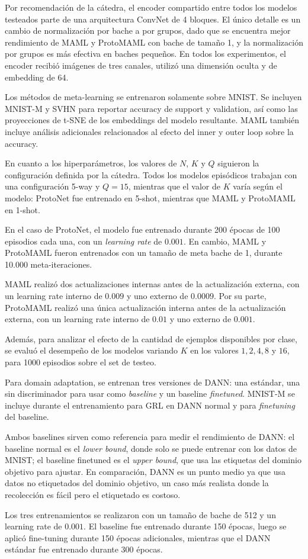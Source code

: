 Por recomendación de la cátedra, el encoder compartido entre todos los modelos testeados parte de una arquitectura ConvNet de 4 bloques. El único detalle es un cambio de normalización por bache a por grupos, dado que se encuentra mejor rendimiento de MAML y ProtoMAML con bache de tamaño 1, y la normalización por grupos es más efectiva en baches pequeños. En todos los experimentos, el encoder recibió imágenes de tres canales, utilizó una dimensión oculta y de embedding de 64.

Los métodos de meta-learning se entrenaron solamente sobre MNIST. Se incluyen MNIST-M y SVHN para reportar accuracy de support y validation, así como las proyecciones de t-SNE de los embeddings del modelo resultante. MAML también incluye análisis adicionales relacionados al efecto del inner y outer loop sobre la accuracy.

En cuanto a los hiperparámetros, los valores de $N$, $K$ y $Q$ siguieron la configuración definida por la cátedra. Todos los modelos episódicos trabajan con una configuración 5-way y $Q=15$, mientras que el valor de $K$ varía según el modelo: ProtoNet fue entrenado en 5-shot, mientras que MAML y ProtoMAML en 1-shot.

En el caso de ProtoNet, el modelo fue entrenado durante 200 épocas de 100 episodios cada una, con un \textit{learning rate} de $0.001$. En cambio, MAML y ProtoMAML fueron entrenados con un tamaño de meta bache de 1, durante 10.000 meta-iteraciones.

MAML realizó dos actualizaciones internas antes de la actualización externa, con un learning rate interno de $0.009$ y uno externo de $0.0009$. Por su parte, ProtoMAML realizó una única actualización interna antes de la actualización externa, con un learning rate interno de $0.01$ y uno externo de $0.001$.

Además, para analizar el efecto de la cantidad de ejemplos disponibles por clase, se evaluó el desempeño de los modelos variando $K$ en los valores $1, 2, 4, 8$ y $16$, para 1000 episodios sobre el set de testeo.

Para domain adaptation, se entrenan tres versiones de DANN: una estándar, una sin discriminador para usar como \textit{baseline} y un baseline \textit{finetuned}. MNIST-M se incluye durante el entrenamiento para GRL en DANN normal y para \textit{finetuning} del baseline.

Ambos baselines sirven como referencia para medir el rendimiento de DANN: el baseline normal es el \textit{lower bound}, donde solo se puede entrenar con los datos de MNIST; el baseline finetuned es el \textit{upper bound}, que usa las etiquetas del dominio objetivo para ajustar. En comparación, DANN es un punto medio ya que usa datos no etiquetados del dominio objetivo, un caso más realista donde la recolección es fácil pero el etiquetado es costoso.

Los tres entrenamientos se realizaron con un tamaño de bache de 512 y un learning rate de $0.001$. El baseline fue entrenado durante 150 épocas, luego se aplicó fine-tuning durante 150 épocas adicionales, mientras que el DANN estándar fue entrenado durante 300 épocas.